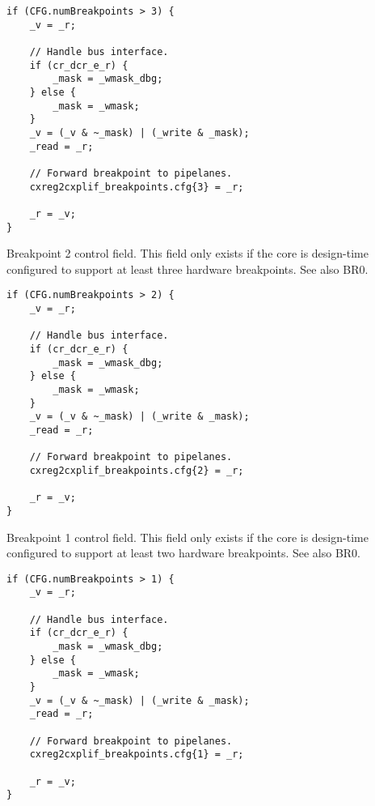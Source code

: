 \declaration{}
\implementation{}
\begin{lstlisting}
if (CFG.numBreakpoints > 3) {
    _v = _r;

    // Handle bus interface.
    if (cr_dcr_e_r) {
        _mask = _wmask_dbg;
    } else {
        _mask = _wmask;
    }
    _v = (_v & ~_mask) | (_write & _mask);
    _read = _r;
    
    // Forward breakpoint to pipelanes.
    cxreg2cxplif_breakpoints.cfg{3} = _r;
    
    _r = _v;
}
\end{lstlisting}

Breakpoint 2 control field. This field only exists if the core is design-time
configured to support at least three hardware breakpoints. See also BR0.

\declaration{}
\implementation{}
\begin{lstlisting}
if (CFG.numBreakpoints > 2) {
    _v = _r;

    // Handle bus interface.
    if (cr_dcr_e_r) {
        _mask = _wmask_dbg;
    } else {
        _mask = _wmask;
    }
    _v = (_v & ~_mask) | (_write & _mask);
    _read = _r;
    
    // Forward breakpoint to pipelanes.
    cxreg2cxplif_breakpoints.cfg{2} = _r;
    
    _r = _v;
}
\end{lstlisting}

Breakpoint 1 control field. This field only exists if the core is design-time
configured to support at least two hardware breakpoints. See also BR0.

\declaration{}
\implementation{}
\begin{lstlisting}
if (CFG.numBreakpoints > 1) {
    _v = _r;

    // Handle bus interface.
    if (cr_dcr_e_r) {
        _mask = _wmask_dbg;
    } else {
        _mask = _wmask;
    }
    _v = (_v & ~_mask) | (_write & _mask);
    _read = _r;
    
    // Forward breakpoint to pipelanes.
    cxreg2cxplif_breakpoints.cfg{1} = _r;
    
    _r = _v;
}
\end{lstlisting}

